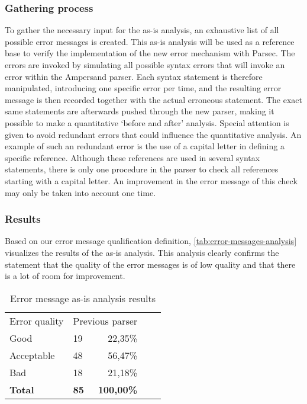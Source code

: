 \subsubsection{Gathering process}

To gather the necessary input for the as-is analysis, an exhaustive list of all possible error messages is created.
This as-is analysis will be used as a reference base to verify the implementation of the new error mechanism with Parsec.
The errors are invoked by simulating all possible syntax errors that will invoke an error within the Ampersand parser.
Each syntax statement is therefore manipulated, introducing one specific error per time, and the resulting error message is then recorded together with the actual erroneous statement.
The exact same statements are afterwards pushed through the new parser, making it possible to make a quantitative `before and after' analysis.
Special attention is given to avoid redundant errors that could influence the quantitative analysis. 
An example of such an redundant error is the use of a capital letter in defining a specific reference. 
Although these references are used in several syntax statements, there is only one procedure in the parser to check all references starting with a capital letter.
An improvement in the error message of this check may only be taken into account one time.

\subsubsection{Results}
Based on our error message qualification definition, \autoref{tab:error-messages-analysis} visualizes the results of the as-is analysis.
This analysis clearly confirms the statement that the quality of the error messages is of low quality and that there is a lot of room for improvement.

\begin{table}[h]
  \centering
	\begin{tabular}{llrlr}
    Error quality  & \multicolumn{2}{c}{Previous parser}     \\
		Good           & 19          & 22,35\%         \\
		Acceptable        & 48          & 56,47\%       \\
		Bad            & 18          & 21,18\%           \\
		\rowcolor[HTML]{BBBBBB}
		\textbf{Total} & \textbf{85} & \textbf{100,00\%} 
	\end{tabular}
  \caption{Error message as-is analysis results}
  \label{tab:error-messages-analysis}
\end{table}
